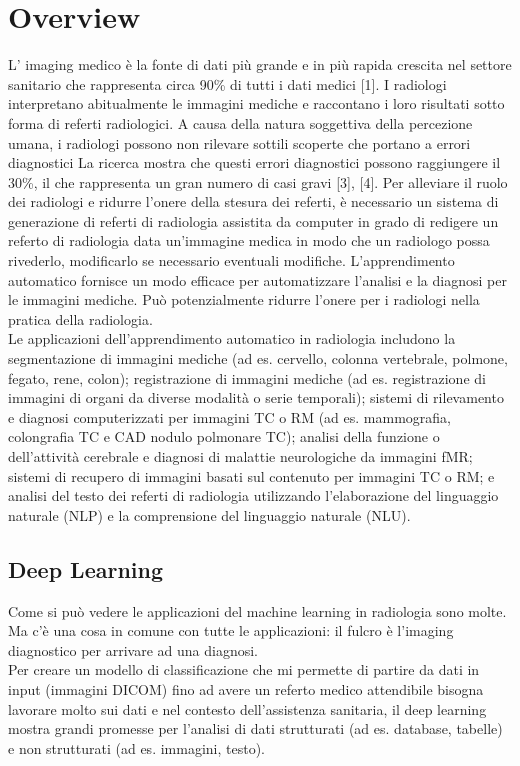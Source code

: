 \documentclass[12pt,a4paper]{report}
\begin{document}
\section{Overview}
L’ imaging medico è la fonte di dati più grande e in più rapida crescita nel settore sanitario che rappresenta circa 90\% di tutti i dati medici [1]. 
I radiologi interpretano abitualmente le immagini mediche e raccontano i loro risultati sotto forma di referti radiologici. A causa della natura soggettiva della percezione umana, i radiologi possono non rilevare sottili scoperte che portano a errori diagnostici La ricerca mostra che questi errori diagnostici possono raggiungere il 30\%, il che rappresenta un gran numero di casi gravi [3], [4].
Per alleviare il ruolo dei radiologi e ridurre l'onere della stesura dei referti, è necessario un sistema di generazione di referti di radiologia assistita da computer in grado di redigere un referto di radiologia data un'immagine medica in modo che un radiologo possa rivederlo, modificarlo se necessario eventuali modifiche.
L'apprendimento automatico fornisce un modo efficace per automatizzare l'analisi e la diagnosi per le immagini mediche. Può potenzialmente ridurre l'onere per i radiologi nella pratica della radiologia.\\
Le applicazioni dell'apprendimento automatico in radiologia includono la segmentazione di immagini mediche (ad es. cervello, colonna vertebrale, polmone, fegato, rene, colon); registrazione di immagini mediche (ad es. registrazione di immagini di organi da diverse modalità o serie temporali); sistemi di rilevamento e diagnosi computerizzati per immagini TC o RM (ad es. mammografia, colongrafia TC e CAD nodulo polmonare TC); analisi della funzione o dell'attività cerebrale e diagnosi di malattie neurologiche da immagini fMR; sistemi di recupero di immagini basati sul contenuto per immagini TC o RM; e analisi del testo dei referti di radiologia utilizzando l'elaborazione del linguaggio naturale (NLP) e la comprensione del linguaggio naturale (NLU).

\subsection{Deep Learning}
Come si può vedere le applicazioni del machine learning in radiologia sono molte. Ma c’è una cosa in comune con tutte le applicazioni: il fulcro è l’imaging diagnostico per arrivare ad una diagnosi.\\
Per creare un modello di classificazione che mi permette di partire da dati in input (immagini DICOM) fino ad avere un referto medico attendibile bisogna lavorare molto sui dati e nel contesto dell'assistenza sanitaria, il deep learning mostra grandi promesse per l'analisi di dati strutturati (ad es. database, tabelle) e non strutturati (ad es. immagini, testo).
\end{document}
